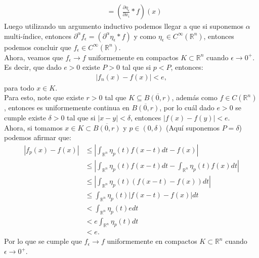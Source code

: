 \begin{homeworkProblem}
\begin{enumerate}
\begin{solucion}
\begin{align*}
          &=\left(\frac{\partial \eta_{\epsilon}}{\partial x_i}*f\right)(x)
        \end{align*}
        Luego utilizando un argumento inductivo podemos llegar a que si suponemos $\alpha$ multi-índice, entonces $\partial^{\alpha}f_{\epsilon}=(\partial^{\alpha}\eta_{\epsilon}*f)$ y como $\eta_{\epsilon}\in C^{\infty}(\mathbb{R}^{n})$, entonces podemos concluir que $f_{\epsilon}\in C^{\infty}(\mathbb{R}^{n})$.\\
        \newpage
        Ahora, veamos que $f_{\epsilon}\rightarrow f$ uniformemente en compactos $K\subset \mathbb{R}^{n}$ cuando $\epsilon\rightarrow 0^+$.\\
        Es decir, que dado $e>0$ existe $P>0$ tal que si $p<P$, entonces:
        \begin{align*}
          |f_n(x)-f(x)|<e,
        \end{align*}
        para todo $x\in K$.\\
        Para esto, note que existe $r>0$ tal que $K\subseteq \overline{B(0,r)}$, además como $f\in C(\mathbb{R}^{n})$, entonces es uniformemente continua en $\overline{B(0,r)}$, por lo cuál dado $e>0$ se cumple existe $\delta>0$ tal que si $|x-y|<\delta$, entonces $|f(x)-f(y)|<e$.\\
        Ahora, si tomamos $x\in K\subset \overline{B(0,r)}$ y $p\in (0,\delta)$ (Aquí suponemos $P=\delta$) podemos afirmar que:
        \begin{align*}
          |f_p(x)-f(x)|&\leq \left| \int_{\mathbb{R}^{n}}\eta_p(t)f(x-t)dt-f(x) \right|\\
          &\leq \left| \int_{\mathbb{R}^{n}}\eta_p(t)f(x-t)dt-\int_{\mathbb{R}^{n}}\eta_p(t)f(x)dt \right|\\
          &\leq \left| \int_{\mathbb{R}^{n}}\eta_p(t)(f(x-t)-f(x))dt \right|\\
          &\leq \int_{\mathbb{R}^{n}}\eta_p(t)|f(x-t)-f(x)|dt\\
          &< \int_{\mathbb{R}^{n}}\eta_p(t)e dt\\
          &< e\int_{\mathbb{R}^{n}}\eta_p(t)dt\\
          &< e. 
        \end{align*}
        Por lo que se cumple que $f_{\epsilon}\rightarrow f$ uniformemente en compactos $K\subset \mathbb{R}^{n}$ cuando $\epsilon \rightarrow 0^+$. 
      \end{solucion}
  \end{enumerate}
\end{homeworkProblem}
